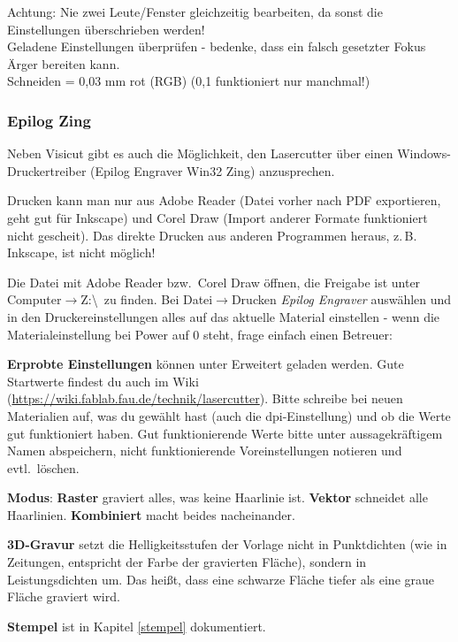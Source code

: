 \documentclass{\basedir/fablab-document}
\renewcommand{\todo}[1]{\textbf{\color{red}{TODO: #1}}}
\begin{document}
	Achtung: Nie zwei Leute/Fenster gleichzeitig bearbeiten, da sonst die Einstellungen überschrieben werden! \\
	Geladene Einstellungen überprüfen - bedenke, dass ein falsch gesetzter Fokus Ärger bereiten kann. \\
	Schneiden = 0,03 mm rot (RGB) (0,1 funktioniert nur manchmal!)

	\todo{...}

	\subsubsection{Epilog Zing}

	Neben Visicut gibt es auch die Möglichkeit, den Lasercutter über einen Windows-Druckertreiber (Epilog Engraver Win32 Zing) anzusprechen.

	Drucken kann man nur aus Adobe Reader (Datei vorher nach PDF exportieren, geht gut für Inkscape) und Corel Draw (Import anderer Formate funktioniert nicht gescheit).  Das direkte Drucken aus anderen Programmen heraus, z.\,B. Inkscape, ist nicht möglich!

	Die Datei mit Adobe Reader bzw.\  Corel Draw öffnen, die Freigabe ist unter Computer$\rightarrow$Z:\textbackslash \ zu finden. Bei Datei$\rightarrow$Drucken \textit{Epilog Engraver} auswählen und in den Druckereinstellungen alles auf das aktuelle Material einstellen - wenn die Materialeinstellung bei Power auf 0 steht, frage einfach einen Betreuer:

	\textbf{Erprobte Einstellungen} können unter Erweitert geladen werden. Gute Startwerte findest du auch im Wiki (\url{https://wiki.fablab.fau.de/technik/lasercutter}). Bitte schreibe bei neuen Materialien auf, was du gewählt hast (auch die dpi-Einstellung) und ob die Werte gut funktioniert haben. Gut funktionierende Werte bitte unter aussagekräftigem Namen abspeichern, nicht funktionierende Voreinstellungen notieren und evtl.\  löschen.

	\textbf{Modus}: \textbf{Raster} graviert alles, was keine Haarlinie ist. \textbf{Vektor} schneidet alle Haarlinien. \textbf{Kombiniert} macht beides nacheinander.

	\textbf{3D-Gravur} setzt die Helligkeitsstufen der Vorlage nicht in Punktdichten (wie in Zeitungen, entspricht der Farbe der gravierten Fläche), sondern in Leistungsdichten um. Das heißt, dass eine schwarze Fläche tiefer als eine graue Fläche graviert wird.

	\textbf{Stempel} ist in Kapitel \ref{stempel} dokumentiert.
\end{document}
